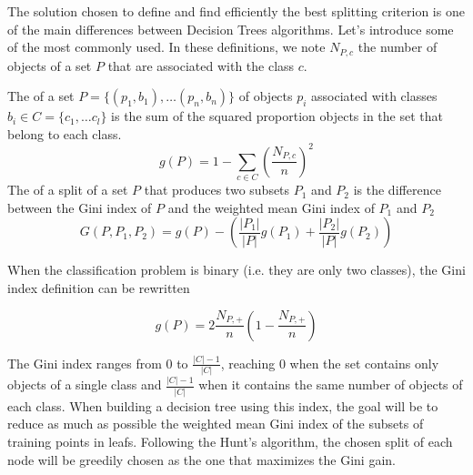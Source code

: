 The solution chosen to define and find efficiently the best splitting criterion is one of the main differences between Decision Trees algorithms. Let's introduce some of the most commonly used. In these definitions, we note $N_{P, c}$ the number of objects of a set $P$ that are associated with the class $c$.

\begin{definition}
    The  of a set $P = \{(p_1, b_1), \dots (p_n, b_n)\}$ of objects $p_i$ associated with classes $b_i \in C = \{c_1, \dots c_l\}$ is the sum of the squared proportion objects in the set that belong to each class.
    \begin{equation}
        g(P) = 1 - \sum_{c \in C} \left(\frac{N_{P, c}}{n}\right)^2
    \end{equation}
    The  of a split of a set $P$ that produces two subsets $P_1$ and $P_2$ is the difference between the Gini index of $P$ and the weighted mean Gini index of $P_1$ and $P_2$
    \begin{equation}
        G(P, P_1, P_2) = g(P) - \left(\frac{|P_1|}{|P|} g(P_1) + \frac{|P_2|}{|P|} g(P_2)\right)
    \end{equation}
\end{definition}

When the classification problem is binary (i.e. they are only two classes), the Gini index definition can be rewritten

\begin{equation}
    g(P) = 2 \frac{N_{P, +}}{n} \left(1 - \frac{N_{P, +}}{n}\right)
\end{equation}

The Gini index ranges from $0$ to $\frac{|C| - 1}{|C|}$, reaching $0$ when the set contains only objects of a single class and $\frac{|C| - 1}{|C|}$ when it contains the same number of objects of each class. When building a decision tree using this index, the goal will be to reduce as much as possible the weighted mean Gini index of the subsets of training points in leafs. Following the Hunt's algorithm, the chosen split of each node will be greedily chosen as the one that maximizes the Gini gain.

